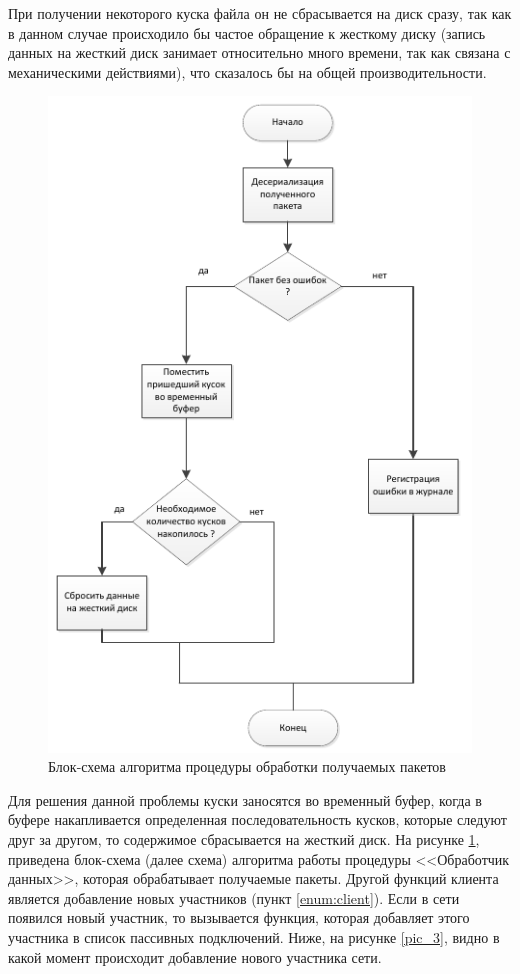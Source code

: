 При получении некоторого куска файла он не сбрасывается на диск сразу, так
как в данном случае происходило бы частое обращение к жесткому диску
(запись данных на жесткий диск занимает относительно много времени, так
как связана с механическими действиями), что сказалось бы на общей
производительности.
\begin{figure}[!hbt]
    \centering
    \includegraphics{pic_2_2}
    \caption{Блок-схема алгоритма процедуры обработки получаемых пакетов}\label{pic_2}
\end{figure}
\newpar
Для решения данной проблемы куски заносятся во
временный буфер, когда в буфере накапливается определенная
последовательность кусков, которые следуют друг за другом, то содержимое
сбрасывается на жесткий диск. На рисунке \ref{pic_2}, приведена блок-схема (далее
схема) алгоритма работы процедуры <<Обработчик данных>>, которая
обрабатывает получаемые пакеты.
\newpar
Другой функций клиента является добавление новых участников (пункт \ref{enum:client}).
\newpar
Если в сети появился новый участник, то вызывается функция, которая
добавляет этого участника в список пассивных подключений. Ниже, на
рисунке \ref{pic_3}, видно в какой момент происходит добавление нового участника
сети.

